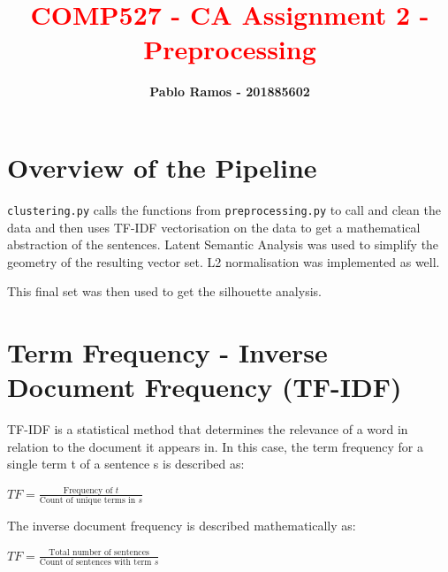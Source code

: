 \documentclass[11pt]{article}
\title{\textcolor{Red}{\textbf{COMP527 - CA Assignment 2 - Preprocessing}}}
\author{\textbf{Pablo Ramos - 201885602}}
\begin{document}
%
%
\maketitle
{\setlength{\parindent}{0mm}{\color{Black} \rule{\linewidth}{0.5mm}}} %

\section{Overview of the Pipeline}

\texttt{clustering.py} calls the functions from \texttt{preprocessing.py} to call and clean the data and then uses TF-IDF vectorisation on the data to get a mathematical abstraction of the sentences. Latent Semantic Analysis was used to simplify the geometry of the resulting vector set. L2 normalisation was implemented as well.

This final set was then used to get the silhouette analysis.

\section{Term Frequency - Inverse Document Frequency (TF-IDF)}

TF-IDF is a statistical method that determines the relevance of a word in relation to the document it appears in. In this case, the term frequency for a single term t of a sentence s is described as:

\begin{center}
  $TF=\frac{\text{Frequency of }t}{\text{Count of unique terms in }s}$
\end{center}

{\setlength{\parindent}{0mm}The inverse document frequency is described mathematically as:}

\begin{center}
  $TF=\frac{\text{Total number of sentences}}{\text{Count of sentences with term }s}$
\end{center}





\end{document}
